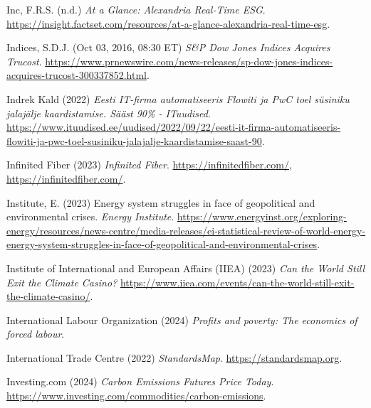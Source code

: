 \documentclass[
  letterpaper,
  DIV=11,
  numbers=noendperiod]{scrartcl}
\newlength{\cslhangindent}
\newenvironment{CSLReferences}[2] %
 {\begin{list}{}{%
  \setlength{\itemindent}{0pt}
  \setlength{\leftmargin}{0pt}
  \setlength{\parsep}{0pt}
  \ifodd #1
   \setlength{\leftmargin}{\cslhangindent}
   \setlength{\itemindent}{-1\cslhangindent}
  \fi
  \setlength{\itemsep}{#2\baselineskip}}}
 {\end{list}}
\begin{document}
\begin{CSLReferences}{0}{1}
Inc, F.R.S. (n.d.) \emph{At a {Glance}: {Alexandria Real-Time ESG}}.
\url{https://insight.factset.com/resources/at-a-glance-alexandria-real-time-esg}.

Indices, S.D.J. (Oct 03, 2016, 08:30 ET) \emph{S\&{P Dow Jones Indices
Acquires Trucost}}.
\url{https://www.prnewswire.com/news-releases/sp-dow-jones-indices-acquires-trucost-300337852.html}.

Indrek Kald (2022) \emph{Eesti {IT-firma} automatiseeris {Flowiti} ja
{PwC} toel s{ü}siniku jalaj{ä}lje kaardistamise. {S{ä}{ä}st} 90\% -
{ITuudised}}.
\url{https://www.ituudised.ee/uudised/2022/09/22/eesti-it-firma-automatiseeris-flowiti-ja-pwc-toel-susiniku-jalajalje-kaardistamise-saast-90}.

Infinited Fiber (2023) \emph{Infinited {Fiber}}.
\href{https://infinitedfiber.com/,\%20https://infinitedfiber.com/}{https://infinitedfiber.com/,
https://infinitedfiber.com/}.

Institute, E. (2023) Energy system struggles in face of geopolitical and
environmental crises. \emph{Energy Institute}.
\url{https://www.energyinst.org/exploring-energy/resources/news-centre/media-releases/ei-statistical-review-of-world-energy-energy-system-struggles-in-face-of-geopolitical-and-environmental-crises}.

Institute of International and European Affairs (IIEA) (2023) \emph{Can
the {World Still Exit} the {Climate Casino}?}
\url{https://www.iiea.com/events/can-the-world-still-exit-the-climate-casino/}.

International Labour Organization (2024) \emph{Profits and poverty:
{The} economics of forced labour}.

International Trade Centre (2022) \emph{{StandardsMap}}.
\url{https://standardsmap.org}.

Investing.com (2024) \emph{Carbon {Emissions Futures Price Today}}.
\url{https://www.investing.com/commodities/carbon-emissions}.


\end{CSLReferences}
\end{document}
